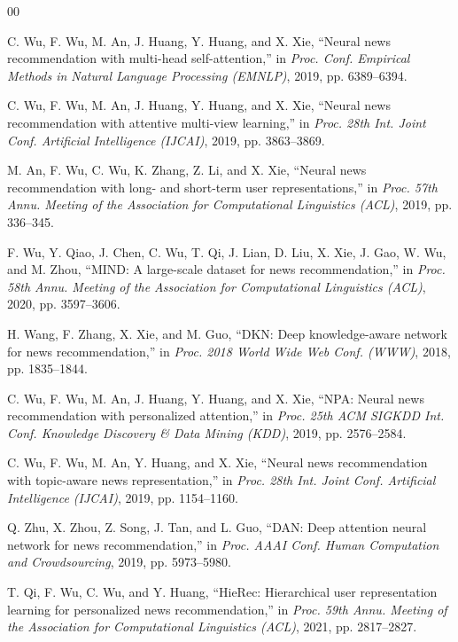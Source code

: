 \documentclass[conference]{IEEEtran}
\begin{document}
\begin{thebibliography}{00}
\footnotesize
\setlength{\itemsep}{1.5pt plus 0.5pt}

 C. Wu, F. Wu, M. An, J. Huang, Y. Huang, and X. Xie, ``Neural news recommendation with multi-head self-attention,'' in \emph{Proc. Conf. Empirical Methods in Natural Language Processing (EMNLP)}, 2019, pp. 6389--6394.

 C. Wu, F. Wu, M. An, J. Huang, Y. Huang, and X. Xie, ``Neural news recommendation with attentive multi-view learning,'' in \emph{Proc. 28th Int. Joint Conf. Artificial Intelligence (IJCAI)}, 2019, pp. 3863--3869.

 M. An, F. Wu, C. Wu, K. Zhang, Z. Li, and X. Xie, ``Neural news recommendation with long- and short-term user representations,'' in \emph{Proc. 57th Annu. Meeting of the Association for Computational Linguistics (ACL)}, 2019, pp. 336--345.

 F. Wu, Y. Qiao, J. Chen, C. Wu, T. Qi, J. Lian, D. Liu, X. Xie, J. Gao, W. Wu, and M. Zhou, ``MIND: A large-scale dataset for news recommendation,'' in \emph{Proc. 58th Annu. Meeting of the Association for Computational Linguistics (ACL)}, 2020, pp. 3597--3606.

 H. Wang, F. Zhang, X. Xie, and M. Guo, ``DKN: Deep knowledge-aware network for news recommendation,'' in \emph{Proc. 2018 World Wide Web Conf. (WWW)}, 2018, pp. 1835--1844.

 C. Wu, F. Wu, M. An, J. Huang, Y. Huang, and X. Xie, ``NPA: Neural news recommendation with personalized attention,'' in \emph{Proc. 25th ACM SIGKDD Int. Conf. Knowledge Discovery \& Data Mining (KDD)}, 2019, pp. 2576--2584.

 C. Wu, F. Wu, M. An, Y. Huang, and X. Xie, ``Neural news recommendation with topic-aware news representation,'' in \emph{Proc. 28th Int. Joint Conf. Artificial Intelligence (IJCAI)}, 2019, pp. 1154--1160.

 Q. Zhu, X. Zhou, Z. Song, J. Tan, and L. Guo, ``DAN: Deep attention neural network for news recommendation,'' in \emph{Proc. AAAI Conf. Human Computation and Crowdsourcing}, 2019, pp. 5973--5980.

 T. Qi, F. Wu, C. Wu, and Y. Huang, ``HieRec: Hierarchical user representation learning for personalized news recommendation,'' in \emph{Proc. 59th Annu. Meeting of the Association for Computational Linguistics (ACL)}, 2021, pp. 2817--2827.


\end{thebibliography}
\end{document}
